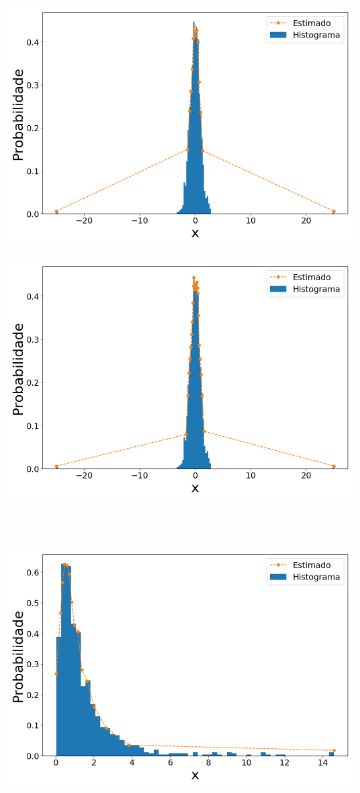 \begin{figure}[H]
\begin{subfigure}[b]{0.45\textwidth}
		\includegraphics[width=\linewidth]{./figuras/CDFm_normal_15_1000_25}
		\caption{}
		\label{fig:cdf_norm15_data_out}
	\end{subfigure}
	\hfill
	\begin{subfigure}[b]{0.45\textwidth}
		\centering 
		\includegraphics[width=\linewidth]{./figuras/CDFm_normal_25_1000_25}
		\caption{}
		\label{fig:cdf_norm25_data_out}
	\end{subfigure}
	\\
	\begin{subfigure}[b]{0.45\textwidth}
		\centering 
		\includegraphics[width=\linewidth]{./figuras/CDFm_lognormal_15_1000_0}

\end{subfigure}
\end{figure}
